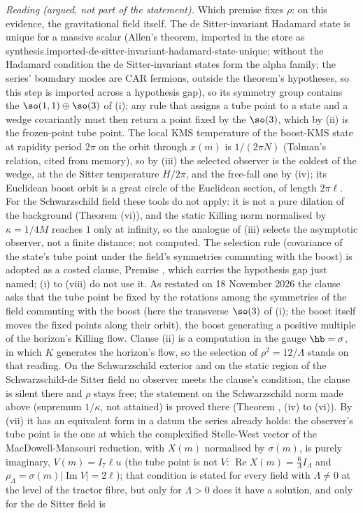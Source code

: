 \emph{Reading (argued, not part of the statement).} Which premise fixes $\rho$: on this evidence, the gravitational field itself. The de Sitter-invariant Hadamard state is unique for a massive scalar (Allen's theorem, imported in the store as synthesis.imported-de-sitter-invariant-hadamard-state-unique; without the Hadamard condition the de Sitter-invariant states form the alpha family; the series' boundary modes are CAR fermions, outside the theorem's hypotheses, so this step is imported across a hypothesis gap), so its symmetry group contains the $\so(1,1) \oplus \so(3)$ of (i); any rule that assigns a tube point to a state and a wedge covariantly must then return a point fixed by the $\so(3)$, which by (ii) is the frozen-point tube point. The local KMS temperature of the boost-KMS state at rapidity period $2\pi$ on the orbit through $x(m)$ is $1/(2\pi N)$ (Tolman's relation, cited from memory), so by (iii) the selected observer is the coldest of the wedge, at the de Sitter temperature $H/2\pi$, and the free-fall one by (iv); its Euclidean boost orbit is a great circle of the Euclidean section, of length $2\pi\ell$. For the Schwarzschild field these tools do not apply: it is not a pure dilation of the background (Theorem (vi)), and the static Killing norm normalised by $\kappa = 1/4M$ reaches $1$ only at infinity, so the analogue of (iii) selects the asymptotic observer, not a finite distance; not computed. The selection rule (covariance of the state's tube point under the field's symmetries commuting with the boost) is adopted as a costed clause, Premise , which carries the hypothesis gap just named; (i) to (viii) do not use it. As restated on 18 November 2026 the clause asks that the tube point be fixed by the rotations among the symmetries of the field commuting with the boost (here the transverse $\so(3)$ of (i); the boost itself moves the fixed points along their orbit), the boost generating a positive multiple of the horizon's Killing flow. Clause (ii) is a computation in the gauge $\hb = \sigma$, in which $K$ generates the horizon's flow, so the selection of $\rho^{2} = 12/\Lambda$ stands on that reading. On the Schwarzschild exterior and on the static region of the Schwarzschild-de Sitter field no observer meets the clause's condition, the clause is silent there and $\rho$ stays free; the statement on the Schwarzschild norm made above (supremum $1/\kappa$, not attained) is proved there (Theorem , (iv) to (vi)). By (vii) it has an equivalent form in a datum the series already holds: the observer's tube point is the one at which the complexified Stelle-West vector of the MacDowell-Mansouri reduction, with $X(m)$ normalised by $\sigma(m)$, is purely imaginary, $V(m) = I_{7}\ell u$ (the tube point is not $V$: $\operatorname{Re}X(m) = \tfrac{6}{\Lambda}I_{\Lambda}$ and $\rho_{\Lambda} = \sigma(m)|\operatorname{Im}V| = 2\ell$); that condition is stated for every field with $\Lambda \neq 0$ at the level of the tractor fibre, but only for $\Lambda > 0$ does it have a solution, and only for the de Sitter field is 